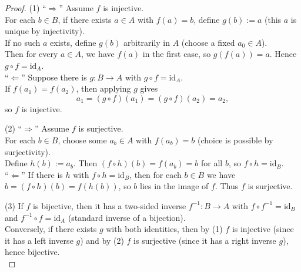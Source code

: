 \documentclass[12pt]{article}
\theoremstyle{definition}
\begin{document}
\newpage

\begin{proof}

\noindent
(1) ``\(\Rightarrow\)'' Assume \(f\) is injective. \\

\noindent
For each \(b \in B\), if there exists \(a \in A\) with \(f(a)=b\), define \(g(b):=a\) (this \(a\) is unique by injectivity).\\ 

\noindent
If no such \(a\) exists, define \(g(b)\) arbitrarily in \(A\) (choose a fixed \(a_0\in A\)). \\

\noindent
Then for every \(a\in A\), we have \(f(a)\) in the first case, so \(g(f(a))=a\). Hence \(g\circ f=\mathrm{id}_A\).\\

\noindent
``\(\Leftarrow\)'' Suppose there is \(g : B \to A\) with \(g\circ f=\mathrm{id}_A\). \\

\noindent
If \(f(a_1)=f(a_2)\), then applying \(g\) gives
\[
a_1=(g\circ f)(a_1)=(g\circ f)(a_2)=a_2,
\]
so \(f\) is injective.\\

\dotfill

\noindent
(2) ``\(\Rightarrow\)'' Assume \(f\) is surjective.\\

\noindent
For each \(b\in B\), choose some \(a_b\in A\) with \(f(a_b)=b\) (choice is possible by surjectivity). \\

\noindent
Define \(h(b):=a_b\). Then \((f\circ h)(b)=f(a_b)=b\) for all \(b\), so \(f\circ h=\mathrm{id}_B\).\\

\noindent
``\(\Leftarrow\)'' If there is \(h\) with \(f\circ h=\mathrm{id}_B\), then for each \(b\in B\) we have \(b=(f\circ h)(b)=f(h(b))\), so \(b\) lies in the image of \(f\). Thus \(f\) is surjective.\\

\dotfill

\noindent
(3) If \(f\) is bijective, then it has a two-sided inverse \(f^{-1}:B\to A\) with
\(f\circ f^{-1}=\mathrm{id}_B\) and \(f^{-1}\circ f=\mathrm{id}_A\) (standard inverse of a bijection).\\

\noindent
Conversely, if there exists \(g\) with both identities, then by (1) \(f\) is injective (since it has a left inverse \(g\)) and by (2) \(f\) is surjective (since it has a right inverse \(g\)), hence bijective.\\


\end{proof}
\end{document}
